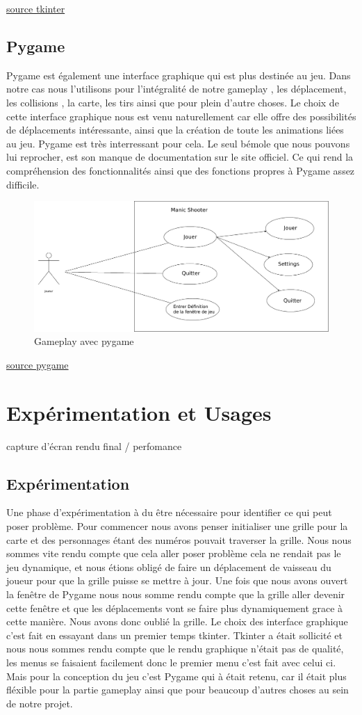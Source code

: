 \documentclass[a4paper, 11pt]{article}
\begin{document}
\href{https://www.tutorialspoint.com/python/python_gui_programming.htm}{source tkinter}

\subsection{Pygame}
Pygame est également une interface graphique qui est plus destinée au jeu.
Dans notre cas nous l'utilisons pour l'intégralité de notre gameplay , les déplacement, les collisions , la carte, les tirs ainsi que pour plein d'autre choses. Le choix de cette interface graphique nous est venu naturellement car elle offre des possibilités de déplacements intéressante, ainsi que la création de toute les animations liées au jeu. Pygame est très interressant pour cela. Le seul bémole que nous pouvons lui reprocher, est son manque de documentation sur le site officiel. Ce qui rend la compréhension des fonctionnalités ainsi que des fonctions propres à Pygame assez difficile.
 \begin{figure}[ht!]
 \centering
 \includegraphics[width=0.5\linewidth]{diag.png}
 \caption{Gameplay avec pygame}
 \label{fig::example::one}
\end{figure}

\href{http://www.pygame.org/docs/}{source pygame}

\section{Expérimentation et Usages}
capture d'écran rendu final / perfomance 

\subsection{Expérimentation}
Une phase d'expérimentation à du être nécessaire pour identifier ce qui peut poser problème.
Pour commencer nous avons penser initialiser une grille pour la carte et des personnages étant des numéros pouvait traverser la grille. Nous nous sommes vite rendu compte que cela aller poser problème cela ne rendait pas le jeu dynamique, et nous étions obligé de faire un déplacement de vaisseau du joueur pour que la grille puisse se mettre à jour.
Une fois que nous avons ouvert la fenêtre de Pygame nous nous somme rendu compte que la grille aller devenir cette fenêtre et que les déplacements vont se faire plus dynamiquement grace à cette manière. Nous avons donc oublié la grille.
Le choix des interface graphique c'est fait en essayant dans un premier temps tkinter. Tkinter a était sollicité et nous nous sommes rendu compte que le rendu graphique n'était pas de qualité, les menus se faisaient facilement donc le premier menu c'est fait avec celui ci. Mais pour la conception du jeu c'est Pygame qui à était retenu, car il était plus fléxible pour la partie gameplay ainsi que pour beaucoup d'autres choses au sein de notre projet.
\end{document}
